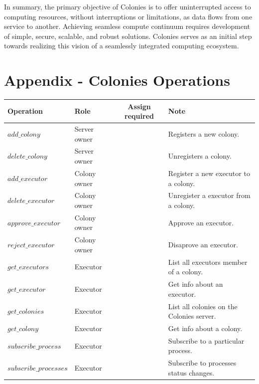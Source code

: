\documentclass{article}
\begin{document}
In summary, the primary objective of Colonies is to offer uninterrupted access to computing resources, without interruptions or limitations, as data flows from one service to another. Achieving seamless compute continuum requires development of simple, secure, scalable, and robust solutions. Colonies serves as an initial step towards realizing this vision of a seamlessly integrated computing ecosystem.


 

\newpage
\appendix
\section{Appendix - Colonies Operations}
\begin{table}[h]
	\centering
	\begin{tabular}{llcl}
		\toprule
		\cmidrule(r){1-4}
        Operation                  & Role         & Assign required & Note \\
		\midrule
        \(add\_colony\)            & Server owner &            & Registers a new colony. \\
        \(delete\_colony\)         & Server owner &            & Unregisters a colony. \\
        \(add\_executor\)          & Colony owner &            & Register a new executor to a colony. \\
        \(delete\_executor\)       & Colony owner &            & Unregister a executor from a colony. \\
        \(approve\_executor\)      & Colony owner &            & Approve an executor. \\
        \(reject\_executor\)       & Colony owner &            & Disaprove an executor. \\
        \(get\_executors\)         & Executor     &            & List all executors member of a colony. \\
        \(get\_executor\)          & Executor     &            & Get info about an executor. \\
        \(get\_colonies\)          & Executor     &            & List all colonies on the Colonies server. \\
        \(get\_colony\)            & Executor     &            & Get info about a colony. \\
        \(subscribe\_process\)     & Executor     &            & Subscribe to a particular process. \\
        \(subscribe\_processes\)   & Executor     &            & Subscribe to processes status changes. \\

\end{tabular}
\end{table}
\end{document}
